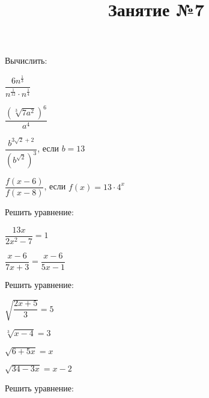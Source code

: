 \newpage
\title{Занятие №7}
\begin{listofex}
	\item Вычислить:
	\begin{enumcols}[itemcolumns=2]
		\item \( \dfrac{6n^{\tfrac{1}{3}}}{n^{\tfrac{1}{12}}\cdot n^{\tfrac{1}{4}}} \) 
		\item \( \dfrac{(\sqrt[3]{7a^2})^6}{a^4} \) 
		\item \( \dfrac{b^{3\sqrt{2}+2}}{(b^{\sqrt{2}})^3} \), если \( b=13 \) 
		\item \( \dfrac{f(x-6)}{f(x-8)} \), если \( f(x)=13\cdot4^x \) 
	\end{enumcols}
	\item Решить уравнение:
	\begin{enumcols}[itemcolumns=2]
		\item \( \dfrac{13x}{2x^2-7}=1 \) 
		\item \( \dfrac{x-6}{7x+3}=\dfrac{x-6}{5x-1} \) 
		\item {}
		\item {}
	\end{enumcols}
	\item Решить уравнение:
	\begin{enumcols}[itemcolumns=2]
		\item \( \sqrt{\dfrac{2x+5}{3}}=5 \) 
		\item \( \sqrt[3]{x-4}=3 \) 
		\item \( \sqrt{6+5x}=x \) 
		\item \( \sqrt{34-3x}=x-2 \) 
		\item {}
		\item {}
	\end{enumcols}
	\item Решить уравнение:
	\begin{enumcols}[itemcolumns=2]
		\item {}
		\item {}
		\item {}
		\item {}
		\item {}
		\item {}
	\end{enumcols}
\end{listofex}
